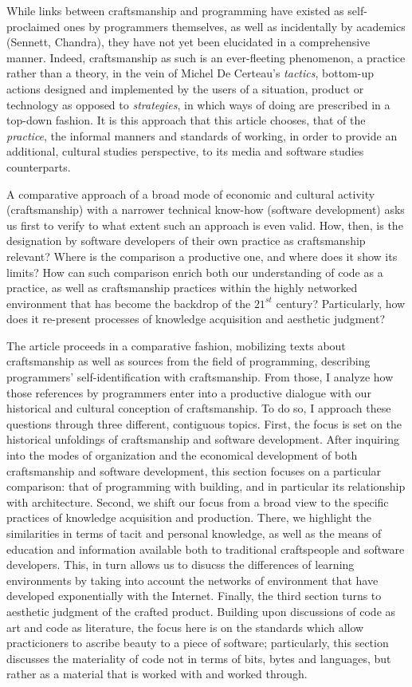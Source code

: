 \documentclass{article}
\begin{document}
While links between craftsmanship and programming have existed as self-proclaimed ones by programmers themselves, as well as incidentally by academics (Sennett, Chandra), they have not yet been elucidated in a comprehensive manner. Indeed, craftsmanship as such is an ever-fleeting phenomenon, a practice rather than a theory, in the vein of Michel De Certeau's \textit{tactics}, bottom-up actions designed and implemented by the users of a situation, product or technology as opposed to \textit{strategies}, in which ways of doing are prescribed in a top-down fashion. It is this approach that this article chooses, that of the \textit{practice}, the informal manners and standards of working, in order to provide an additional, cultural studies perspective, to its media and software studies counterparts.

A comparative approach of a broad mode of economic and cultural activity (craftsmanship) with a narrower technical know-how (software development) asks us first to verify to what extent such an approach is even valid. How, then, is the designation by software developers of their own practice as craftsmanship relevant? Where is the comparison a productive one, and where does it show its limits? How can such comparison enrich both our understanding of code as a practice, as well as craftsmanship practices within the highly networked environment that has become the backdrop of the $21^{st}$ century? Particularly, how does it re-present processes of knowledge acquisition and aesthetic judgment?

The article proceeds in a comparative fashion, mobilizing texts about craftsmanship as well as sources from the field of programming, describing programmers' self-identification with craftsmanship. From those, I analyze how those references by programmers enter into a productive dialogue with our historical and cultural conception of craftsmanship. To do so, I approach these questions through three different, contiguous topics. First, the focus is set on the historical unfoldings of craftsmanship and software development. After inquiring into the modes of organization and the economical development of both craftsmanship and software development, this section focuses on a particular comparison: that of programming with building, and in particular its relationship with architecture. Second, we shift our focus from a broad view to the specific practices of knowledge acquisition and production. There, we highlight the similarities in terms of tacit and personal knowledge, as well as the means of education and information available both to traditional craftspeople and software developers. This, in turn allows us to disucss the differences of learning environments by taking into account the networks of environment that have developed exponentially with the Internet. Finally, the third section turns to aesthetic judgment of the crafted product. Building upon discussions of code as art and code as literature, the focus here is on the standards which allow practicioners to ascribe beauty to a piece of software; particularly, this section discusses the materiality of code not in terms of bits, bytes and languages, but rather as a material that is worked with and worked through.
\end{document}
